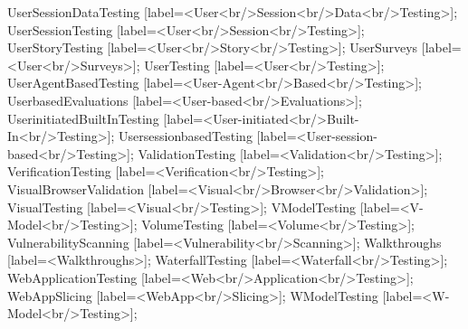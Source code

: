 \documentclass{article}
\begin{document}
{UserSessionDataTesting [label=<User<br/>Session<br/>Data<br/>Testing>];
UserSessionTesting [label=<User<br/>Session<br/>Testing>];
UserStoryTesting [label=<User<br/>Story<br/>Testing>];
UserSurveys [label=<User<br/>Surveys>];
UserTesting [label=<User<br/>Testing>];
UserAgentBasedTesting [label=<User-Agent<br/>Based<br/>Testing>];
UserbasedEvaluations [label=<User-based<br/>Evaluations>];
UserinitiatedBuiltInTesting [label=<User-initiated<br/>Built-In<br/>Testing>];
UsersessionbasedTesting [label=<User-session-based<br/>Testing>];
ValidationTesting [label=<Validation<br/>Testing>];
VerificationTesting [label=<Verification<br/>Testing>];
VisualBrowserValidation [label=<Visual<br/>Browser<br/>Validation>];
VisualTesting [label=<Visual<br/>Testing>];
VModelTesting [label=<V-Model<br/>Testing>];
VolumeTesting [label=<Volume<br/>Testing>];
VulnerabilityScanning [label=<Vulnerability<br/>Scanning>];
Walkthroughs [label=<Walkthroughs>];
WaterfallTesting [label=<Waterfall<br/>Testing>];
WebApplicationTesting [label=<Web<br/>Application<br/>Testing>];
WebAppSlicing [label=<WebApp<br/>Slicing>];
WModelTesting [label=<W-Model<br/>Testing>];

}
\end{document}
